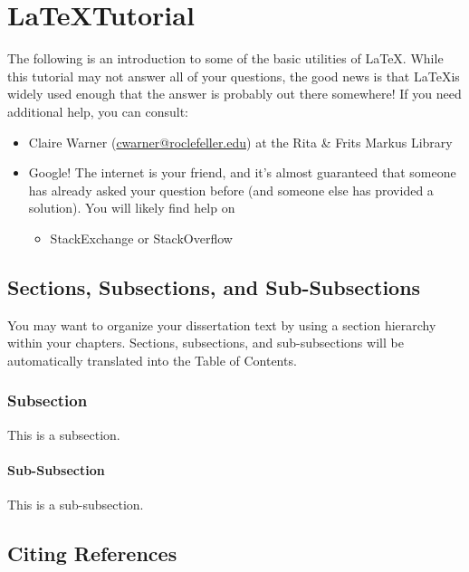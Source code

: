 \chapter*{\LaTeX Tutorial}

The following is an introduction to some of the basic utilities of \LaTeX. While this tutorial may not answer all of your questions, the good news is that \LaTeX is widely used enough that the answer is probably out there somewhere! If you need additional help, you can consult:

\begin{itemize}
    \item Claire Warner (\url{cwarner@roclefeller.edu}) at the Rita \& Frits Markus Library
    \item Google! The internet is your friend, and it's almost guaranteed that someone has already asked your question before (and someone else has provided a solution). You will likely find help on 
    \begin{itemize}
        \item StackExchange or StackOverflow
        
    \end{itemize}
\end{itemize}

\section{Sections, Subsections, and Sub-Subsections}

You may want to organize your dissertation text by using a section hierarchy within your chapters. Sections, subsections, and sub-subsections will be automatically translated into the Table of Contents. 

\subsection{Subsection}

This is a subsection.

\subsubsection{Sub-Subsection}

This is a sub-subsection.

\section{Citing References}

